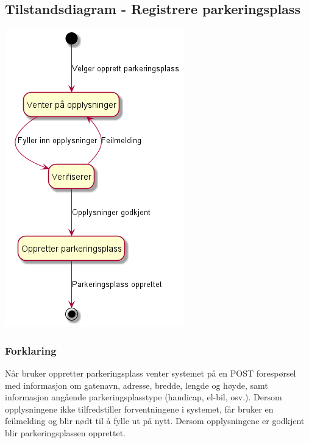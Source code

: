 \documentclass[12pt]{article}
\begin{document}
    \subsection{Tilstandsdiagram - Registrere parkeringsplass}
    \includegraphics[max width=\textwidth]{bilder/diagrammer/opprett_parkeringsplass_tilstandsdiagram.png}
    
        \subsubsection{Forklaring}
        Når bruker oppretter parkeringsplass venter systemet på en POST forespørsel med informasjon om gatenavn, adresse, bredde, lengde og høyde, samt informasjon angående parkeringsplasstype (handicap, el-bil, osv.). Dersom opplysningene ikke tilfredstiller forventningene i systemet, får bruker en feilmelding og blir nødt til å fylle ut på nytt. Dersom opplysningene er godkjent blir parkeringsplassen opprettet. 
\end{document}
